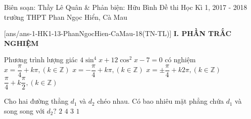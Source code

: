 	\begin{name}
		{Biên soạn: Thầy Lê Quân \& Phản biện: Hữu Bình}
		{Đề thi Học Kì 1, 2017 - 2018 trường THPT Phan Ngọc Hiển, Cà Mau}
	\end{name}
	\setcounter{ex}{0}\setcounter{bt}{0}
	[ans/ans-1-HK1-13-PhanNgocHien-CaMau-18(TN-TL)]
\noindent\textbf{I. PHẦN TRẮC NGHIỆM}

\begin{ex}%
	Phương trình lượng giác $4\sin^4x+12\cos^2x-7=0$ có nghiệm
	\choice
	{$x=\dfrac{\pi}{4}+k\pi,(k\in\mathbb{Z})$}
	{$x=-\dfrac{\pi}{4}+k\pi,(k\in\mathbb{Z})$}
	{$x=\pm\dfrac{\pi}{4}+k2\pi,(k\in\mathbb{Z})$}
	{\True $\dfrac{\pi}{4}+k\dfrac{\pi}{2},(k\in\mathbb{Z})$}
\end{ex}
\begin{ex}%
	Cho hai đường thẳng $d_1$ và $d_2$ chéo nhau. Có bao nhiêu mặt phẳng chứa 
	$d_1$ và song song với $d_2?$
	\choice
	{$2$}
	{$4$}
	{$3$}
	{\True $1$}
\end{ex}

